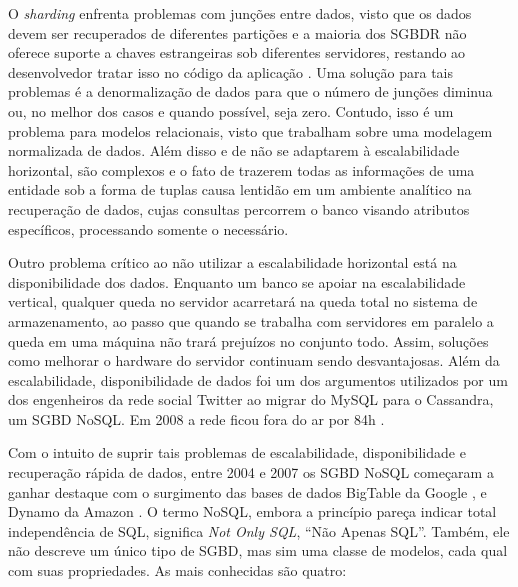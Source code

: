 O \textit{sharding} enfrenta problemas com junções entre dados, visto que os dados 
devem ser recuperados de diferentes partições e a maioria dos SGBDR não 
oferece suporte a chaves estrangeiras sob diferentes servidores, restando 
ao desenvolvedor tratar isso no código da aplicação \cite{pritchett2008base}. 
Uma solução para tais 
problemas é a denormalização de dados para que o número de junções diminua ou, 
no melhor dos casos e quando possível, seja zero. Contudo, isso é um problema 
para modelos relacionais, visto que trabalham sobre uma modelagem normalizada de dados. 
Além disso e de não se adaptarem à escalabilidade horizontal, 
são complexos e o fato de trazerem todas as informações de uma entidade sob a 
forma de tuplas causa lentidão em um ambiente analítico na recuperação de dados, 
cujas consultas percorrem o banco visando atributos específicos, processando 
somente o necessário. 

Outro problema crítico ao não utilizar a escalabilidade horizontal está na 
disponibilidade dos dados. Enquanto um banco se apoiar na escalabilidade vertical, 
qualquer queda no servidor acarretará na queda total no sistema de armazenamento, 
ao passo que quando se trabalha com servidores em paralelo a queda em uma máquina 
não trará prejuízos no conjunto todo. Assim, soluções como melhorar o hardware do 
servidor continuam sendo desvantajosas. Além da escalabilidade, disponibilidade 
de dados foi um dos argumentos utilizados por um dos engenheiros da rede social 
Twitter ao migrar do MySQL para o Cassandra, um SGBD NoSQL. 
Em 2008 a rede ficou fora do ar por 84h \cite{twitter2010}.

Com o intuito de suprir tais problemas de escalabilidade, disponibilidade 
e recuperação rápida de dados, entre 2004 e 2007 os SGBD NoSQL começaram 
a ganhar destaque com o surgimento das bases de dados BigTable da Google \cite{chang2008bigtable}, e Dynamo 
da Amazon \cite{decandia2007dynamo}. O termo NoSQL, embora a princípio pareça indicar total independência 
de SQL, significa \textit{Not Only SQL}, “Não Apenas SQL”. Também, ele não descreve um 
único tipo de SGBD, mas sim uma classe de modelos, cada qual com suas propriedades. 
As mais conhecidas são quatro:

